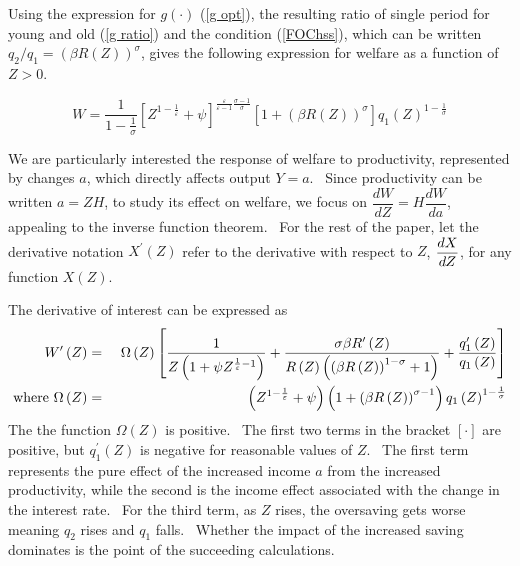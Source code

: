 \documentclass{article}
\begin{document}
\begin{doublespace}
Using the expression for $g\left( \cdot \right) $ (\ref{g opt}), the
resulting ratio of single period for young and old (\ref{g ratio}) and the
condition (\ref{FOChss}), which can be written $q_{2}/q_{1}=\left( \beta
R\left( Z\right) \right) ^{\sigma }$, gives the following expression for
welfare as a function of $Z>0$.

\begin{equation}
W=\frac{1}{1-\frac{1}{\sigma }}\left[ Z^{1-\frac{1}{\varepsilon }}+\psi %
\right] ^{\frac{\varepsilon }{\varepsilon -1}\frac{\sigma -1}{\sigma }}\left[
1+\left( \beta R\left( Z\right) \right) ^{\sigma }\right] q_{1}\left(
Z\right) ^{1-\frac{1}{\sigma }}  \label{W(Z)}
\end{equation}

We are particularly interested the response of welfare to productivity,
represented by changes $a$, which directly affects output $Y=a$. \ Since
productivity can be written $a=ZH$, to study its effect on welfare, we focus
on $\dfrac{dW}{dZ}=H\dfrac{dW}{da}$, appealing to the inverse function
theorem. \ For the rest of the paper, let the derivative notation $X^{\prime
}\left( Z\right) $ refer to the derivative with respect to $Z$, $\dfrac{dX}{%
dZ}$, for any function $X\left( Z\right) $.

The derivative of interest can be expressed as%
\begin{eqnarray*}
W^{\prime }\left( Z\right) &=&\text{ }\Omega \left( Z\right) \left[ \frac{1}{%
Z\left( 1+\psi Z^{\frac{1}{\varepsilon }-1}\right) }+\frac{\sigma \beta
R^{\prime }\left( Z\right) }{R\left( Z\right) \left( \left( \beta R\left(
Z\right) \right) ^{1-\sigma }+1\right) }+\frac{q_{1}^{\prime }\left(
Z\right) }{q_{1}\left( Z\right) }\right] \\
\text{where }\Omega \left( Z\right) &=&\left( Z^{1-\frac{1}{\varepsilon }%
}+\psi \right) \left( 1+\left( \beta R\left( Z\right) \right) ^{\sigma
-1}\right) q_{1}\left( Z\right) ^{1-\frac{1}{\sigma }}
\end{eqnarray*}%
The the function $\Omega \left( Z\right) $ is positive. \ The first two
terms in the bracket $\left[ \cdot \right] $ are positive, but $%
q_{1}^{\prime }\left( Z\right) $ is negative for reasonable values of $Z.$ \
The first term represents the pure effect of the increased income $a$ from
the increased productivity, while the second is the income effect associated
with the change in the interest rate. \ For the third term, as $Z$ rises,
the oversaving gets worse meaning $q_{2}$ rises and $q_{1}$ falls. \ Whether
the impact of the increased saving dominates is the point of the succeeding
calculations.


\end{doublespace}
\end{document}

